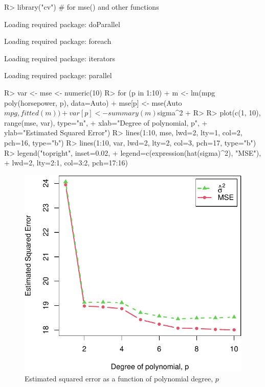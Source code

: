 \documentclass[
]{jss}
\begin{document}
\begin{CodeChunk}
\begin{CodeInput}
R> library("cv") # for mse() and other functions
\end{CodeInput}
\begin{CodeOutput}
Loading required package: doParallel
\end{CodeOutput}
\begin{CodeOutput}
Loading required package: foreach
\end{CodeOutput}
\begin{CodeOutput}
Loading required package: iterators
\end{CodeOutput}
\begin{CodeOutput}
Loading required package: parallel
\end{CodeOutput}
\begin{CodeInput}
R> var <- mse <- numeric(10)
R> for (p in 1:10){
+   m <- lm(mpg ~ poly(horsepower, p), data=Auto)
+   mse[p] <- mse(Auto$mpg, fitted(m))
+   var[p] <- summary(m)$sigma^2
+ }
R> 
R> plot(c(1, 10), range(mse, var), type="n",
+      xlab="Degree of polynomial, p",
+      ylab="Estimated Squared Error")
R> lines(1:10, mse, lwd=2, lty=1, col=2, pch=16, type="b")
R> lines(1:10, var, lwd=2, lty=2, col=3, pch=17, type="b")
R> legend("topright", inset=0.02,
+        legend=c(expression(hat(sigma)^2), "MSE"),
+        lwd=2, lty=2:1, col=3:2, pch=17:16)
\end{CodeInput}
\begin{figure}

{\centering \includegraphics[width=0.5\linewidth]{JSS-article-reduced_files/figure-latex/mpg-horsepower-MSE-se-1} 

}

\caption[Estimated squared error as a function of polynomial degree, $p$]{Estimated squared error as a function of polynomial degree, $p$}\label{fig:mpg-horsepower-MSE-se}
\end{figure}
\end{CodeChunk}
\end{document}

